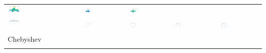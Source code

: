 \documentclass[11pt,compress,xcolor={usenames,dvipsnames},aspectratio=169]{beamer}
\begin{document}
\begin{frame}
\begin{tabular}{>{\centering}m{}>{\centering}m{}>{\centering}m{}>{\centering}m{}>{\centering}m{}}
\includegraphics[width =0.18\textwidth]{ProgramsImages/Legendre_Degree_1_3.png}  &
\includegraphics[width =0.18\textwidth]{ProgramsImages/Legendre_Degree_2_2.png}  &
\includegraphics[width =0.18\textwidth]{ProgramsImages/Legendre_Degree_2_3.png} 
\tabularnewline[0ex]
		\includegraphics[width =0.18\textwidth]{ProgramsImages/Chebyshev_Degree_0.png}  &
\includegraphics[width =0.18\textwidth]{ProgramsImages/Chebyshev_Degree_1.png}  &
\includegraphics[width =0.18\textwidth]{ProgramsImages/Chebyshev_Degree_2.png}  &
\includegraphics[width =0.18\textwidth]{ProgramsImages/Chebyshev_Degree_3.png}  &
\includegraphics[width =0.18\textwidth]{ProgramsImages/Chebyshev_Degree_4.png} 
\tabularnewline[-7ex]
Chebyshev \tabularnewline
\tabularnewline

\end{tabular}
\end{frame}
\end{document}
